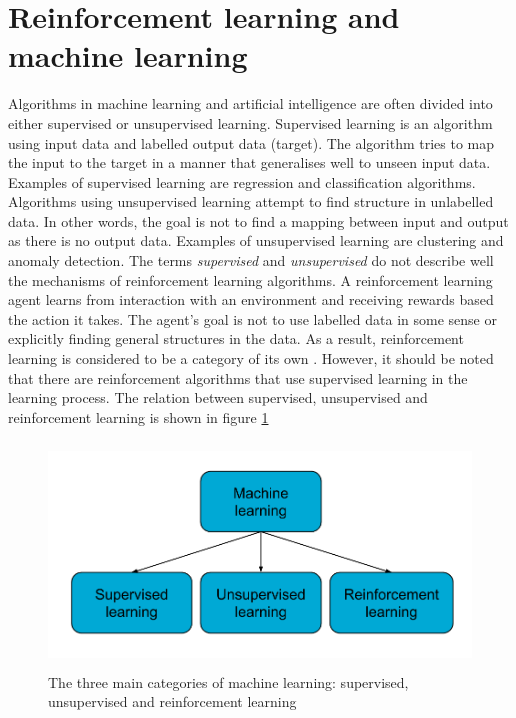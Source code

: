 \documentclass[class=book, crop=false, 11pt]{standalone}
\begin{document}
\section{Reinforcement learning and machine learning}
Algorithms in machine learning and artificial intelligence are often divided into either supervised or unsupervised learning. Supervised learning is an algorithm using input data and labelled output data (target). The algorithm tries to map the input to the target in a manner that generalises well to unseen input data. Examples of supervised learning are regression and classification algorithms. Algorithms using unsupervised learning attempt to find structure in unlabelled data. In other words, the goal is not to find a mapping between input and output as there is no output data. Examples of unsupervised learning are clustering and anomaly detection. The terms \textit{supervised} and \textit{unsupervised} do not describe well the mechanisms of reinforcement learning algorithms. A reinforcement learning agent learns from interaction with an environment and receiving rewards based the action it takes. The agent's goal is not to use labelled data in some sense or explicitly finding general structures in the data. As a result, reinforcement learning is considered to be a category of its own \cite{Sutton1998}. However, it should be noted that there are reinforcement algorithms that use supervised learning in the learning process. The relation between supervised, unsupervised and reinforcement learning is shown in figure \ref{fig:theory:supervised_vs_rl}


\begin{figure}[ht!]
    \center
    \includegraphics[height=6cm, width=12cm]{figures/supervised_vs_rl.png}
    \caption  {The three main categories of machine learning: supervised, unsupervised and reinforcement learning}
    \label{fig:theory:supervised_vs_rl}
\end{figure}
\end{document}
